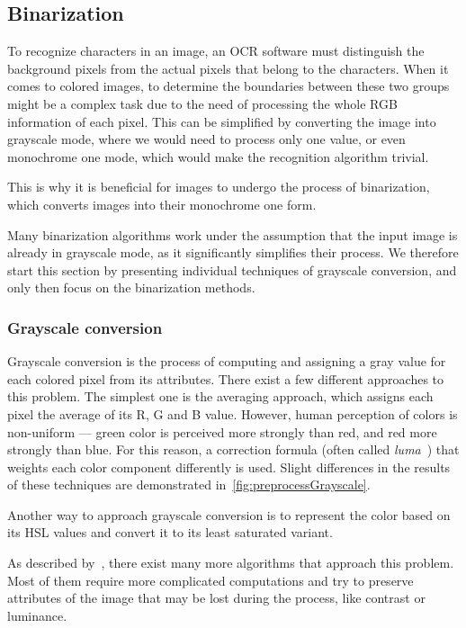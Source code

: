 \subsection{Binarization} \label{binarization}

To recognize characters in an image, an OCR software must distinguish the background pixels from the actual pixels that belong to the characters. When it comes to colored images, to determine the boundaries between these two groups might be a complex task due to the need of processing the whole RGB information of each pixel. This can be simplified by converting the image into grayscale mode, where we would need to process only one value, or even monochrome one mode, which would make the recognition algorithm trivial.

This is why it is beneficial for images to undergo the process of binarization, which converts images into their monochrome one form.

Many binarization algorithms work under the assumption that the input image is already in grayscale mode, as it significantly simplifies their process. We therefore start this section by presenting individual techniques of grayscale conversion, and only then focus on the binarization methods.

\subsubsection{Grayscale conversion} \label{grayscaleConversion}

Grayscale conversion is the process of computing and assigning a gray value for each colored pixel from its attributes. There exist a few different approaches to this problem. The simplest one is the averaging approach, which assigns each pixel the average of its R, G and B value. However, human perception of colors is non-uniform --- green color is perceived more strongly than red, and red more strongly than blue. For this reason, a correction formula (often called \emph{luma}~\cite{grayscaleConv}) that weights each color component differently is used. Slight differences in the results of these techniques are demonstrated in~\cref{fig:preprocessGrayscale}.

Another way to approach grayscale conversion is to represent the color based on its HSL values and convert it to its least saturated variant.

As described by~\citet{grayscaleCadik}, there exist many more algorithms that approach this problem. Most of them require more complicated computations and try to preserve attributes of the image that may be lost during the process, like contrast or luminance.

